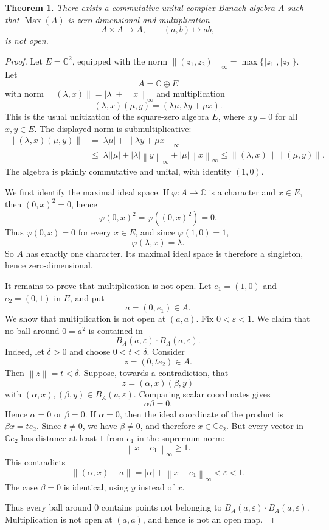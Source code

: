 \documentclass[11pt]{amsart}
\newtheorem{theorem}{Theorem}
\newcommand{\C}{\mathbb C}
\newcommand{\norm}[1]{\left\|#1\right\|}
\newcommand{\Max}{\operatorname{Max}}
\begin{document}
\begin{theorem}
There exists a commutative unital complex Banach algebra \(A\) such that
\(\Max(A)\) is zero-dimensional and multiplication
\[
  A\times A\longrightarrow A,\qquad (a,b)\mapsto ab,
\]
is not open.
\end{theorem}

\begin{proof}
Let \(E=\C^2\), equipped with the norm
\(\norm{(z_1,z_2)}_\infty=\max\{|z_1|,|z_2|\}\).  Let
\[
  A=\C\oplus E
\]
with norm \(\norm{(\lambda,x)}=|\lambda|+\norm{x}_\infty\) and multiplication
\[
  (\lambda,x)(\mu,y)=(\lambda\mu,\lambda y+\mu x).
\]
This is the usual unitization of the square-zero algebra \(E\), where
\(xy=0\) for all \(x,y\in E\).  The displayed norm is submultiplicative:
\[
\begin{aligned}
\norm{(\lambda,x)(\mu,y)}
&=|\lambda\mu|+\norm{\lambda y+\mu x}_\infty  \\
&\le |\lambda||\mu|+|\lambda|\norm y_\infty+|\mu|\norm x_\infty
 \le \norm{(\lambda,x)}\norm{(\mu,y)}.
\end{aligned}
\]
The algebra is plainly commutative and unital, with identity \((1,0)\).

We first identify the maximal ideal space.  If \(\varphi:A\to\C\) is a
character and \(x\in E\), then \((0,x)^2=0\), hence
\[
  \varphi(0,x)^2=\varphi((0,x)^2)=0.
\]
Thus \(\varphi(0,x)=0\) for every \(x\in E\), and since \(\varphi(1,0)=1\),
\[
  \varphi(\lambda,x)=\lambda .
\]
So \(A\) has exactly one character.  Its maximal ideal space is therefore a
singleton, hence zero-dimensional.

It remains to prove that multiplication is not open.  Let \(e_1=(1,0)\) and
\(e_2=(0,1)\) in \(E\), and put
\[
  a=(0,e_1)\in A .
\]
We show that multiplication is not open at \((a,a)\).  Fix
\(0<\varepsilon<1\).  We claim that no ball around \(0=a^2\) is contained in
\[
  B_A(a,\varepsilon)\cdot B_A(a,\varepsilon).
\]
Indeed, let \(\delta>0\) and choose \(0<t<\delta\).  Consider
\[
  z=(0,t e_2)\in A.
\]
Then \(\norm z=t<\delta\).  Suppose, towards a contradiction, that
\[
  z=(\alpha,x)(\beta,y)
\]
with \((\alpha,x),(\beta,y)\in B_A(a,\varepsilon)\).  Comparing scalar
coordinates gives
\[
  \alpha\beta=0.
\]
Hence \(\alpha=0\) or \(\beta=0\).  If \(\alpha=0\), then the ideal coordinate
of the product is \(\beta x=t e_2\).  Since \(t\ne0\), we have
\(\beta\ne0\), and therefore \(x\in\C e_2\).  But every vector in
\(\C e_2\) has distance at least \(1\) from \(e_1\) in the supremum norm:
\[
  \norm{x-e_1}_\infty\ge1.
\]
This contradicts
\[
  \norm{(\alpha,x)-a}=|\alpha|+\norm{x-e_1}_\infty<\varepsilon<1.
\]
The case \(\beta=0\) is identical, using \(y\) instead of \(x\).

Thus every ball around \(0\) contains points not belonging to
\(B_A(a,\varepsilon)\cdot B_A(a,\varepsilon)\).  Multiplication is not open at
\((a,a)\), and hence is not an open map.
\end{proof}
\end{document}
